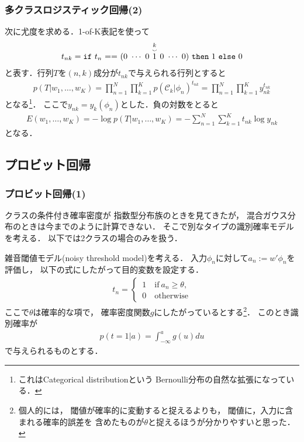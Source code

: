 \documentclass[10pt,%
hyperref={unicode}]{beamer}
\begin{document}
\begin{frame}
    \frametitle{多クラスロジスティック回帰(2)}
    次に尤度を求める．1-of-K表記を使って
    \begin{align*}
        t_{nk} = \mathtt{if}\ t_n\ \mathtt{==}\ (0\ \cdots\ 0
            \ \raisebox{.7pt}{$\stackrel{\substack{k \\ \smallsmile}}{1}$}
            \ 0\ \cdots\ 0)\ \mathtt{then}\ 1\ \mathtt{else}\ 0
    \end{align*}
    と表す．行列$T$を$(n,k)$成分が$t_{nk}$で与えられる行列とすると
    \begin{align}
        p(T|w_1,\ldots,w_K)
        = \prod_{n = 1}^N \prod_{k = 1}^K p(\mathcal{C}_k|\phi_n)^{t_{nk}}
        = \prod_{n = 1}^N \prod_{k = 1}^K y_{nk}^{t_{nk}}
        \tag{4.107}
    \end{align}
    となる\footnote{これはCategorical distributionという
        Bernoulli分布の自然な拡張になっている．}．
    ここで$y_{nk} = y_k(\phi_n)$とした．負の対数をとると
    \begin{align}
        E(w_1,\ldots,w_K) = -\log p(T|w_1,\ldots,w_K)
                          = -\sum_{n = 1}^N \sum_{k = 1}^K t_{nk} \log y_{nk}
        \tag{4.108}
    \end{align}
    となる．
\end{frame}

\subsection{プロビット回帰}
\begin{frame}
    \frametitle{プロビット回帰(1)}
    クラスの条件付き確率密度が
    指数型分布族のときを見てきたが，
    混合ガウス分布のときは今までのように計算できない．
    そこで別なタイプの識別確率モデルを考える．
    以下では2クラスの場合のみを扱う．

    \bigskip

    雑音閾値モデル(noisy threshold model)を考える．
    入力$\phi_n$に対して$a_n := w'\phi_n$を評価し，
    以下の式にしたがって目的変数を設定する．
    \begin{align}
        t_n =
        \begin{cases}
            \,1 \quad\mathrm{if}\ a_n \geq \theta, \\
            \,0 \quad\mathrm{otherwise}
        \end{cases}
        \tag{4.112}
    \end{align}
    ここで$\theta$は確率的な項で，
    確率密度関数$g$にしたがっているとする\footnote{個人的には，
        閾値が確率的に変動すると捉えるよりも，
        閾値に，入力に含まれる確率的誤差を
    含めたものが$\theta$と捉えるほうが分かりやすいと思った．}．
    このとき識別確率が
    \begin{align}
        p(t = 1| a) = \int_{-\infty}^a g(u)du \tag{4.113}
    \end{align}
    で与えられるものとする．
\end{frame}
\end{document}
